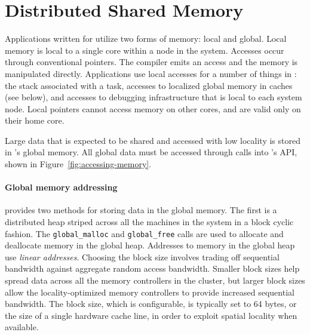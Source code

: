 \section{Distributed Shared Memory}

Applications written for \Grappa utilize two forms of memory: local and
global. Local memory is local to a single core within a node in the system.
Accesses occur through conventional pointers. The compiler emits an access and
the memory is manipulated directly. Applications use local accesses for a
number of things in \Grappa: the stack associated with a task, accesses to
localized global memory in caches (see below), and accesses to debugging
infrastructure that is local to each system node. Local pointers cannot access
memory on other cores, and are valid only on their home core.

Large data that is expected to be shared and accessed with low locality is
stored in \Grappa's global memory. All global data must be accessed through
calls into \Grappa's API, shown in Figure~\ref{fig:accessing-memory}.


\paragraph{Global memory addressing} \Grappa provides two methods for storing
data in the global memory. The first is a distributed heap striped across all
the machines in the system in a block cyclic fashion. The
\texttt{global\_malloc} and \texttt{global\_free} calls are used to allocate
and deallocate memory in the global heap. Addresses to memory in the global
heap use \emph{linear addresses}. Choosing the block size involves trading off
sequential bandwidth against aggregate random access bandwidth. Smaller block
sizes help spread data across all the memory controllers in the cluster, but
larger block sizes allow the locality-optimized memory controllers to provide
increased sequential bandwidth. The block size, which is configurable, is
typically set to 64 bytes, or the size of a single hardware cache line, in
order to exploit spatial locality when available.

